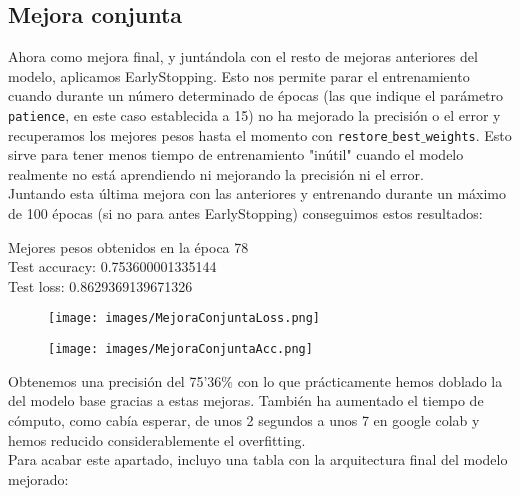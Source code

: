 \documentclass[12pt]{article}
\begin{document}
\subsection*{Mejora conjunta}
Ahora como mejora final, y juntándola con el resto de mejoras anteriores del modelo, aplicamos EarlyStopping. Esto nos permite parar el entrenamiento cuando durante un número determinado de épocas (las que indique el parámetro \texttt{patience}, en este caso establecida a 15) no ha mejorado la precisión o el error y recuperamos los mejores pesos hasta el momento con \texttt{restore$\_$best$\_$weights}. Esto sirve para tener menos tiempo de entrenamiento "inútil" cuando el modelo realmente no está aprendiendo ni mejorando la precisión ni el error.\\
Juntando esta última mejora con las anteriores y entrenando durante un máximo de 100 épocas (si no para antes EarlyStopping) conseguimos estos resultados:\\
\begin{center}
Mejores pesos obtenidos en la época 78\\
Test accuracy: 0.753600001335144\\
Test loss: 0.8629369139671326\\
\end{center}
\begin{figure}[H]
\centering
\parbox{8cm}{
\texttt{[image: images/MejoraConjuntaLoss.png]}
\caption{}
\label{fig:2figsA}}
\begin{minipage}{8cm}
\texttt{[image: images/MejoraConjuntaAcc.png]}
\caption{}
\label{fig:2figsB}
\end{minipage}
\end{figure}
Obtenemos una precisión del 75'36$\%$ con lo que prácticamente hemos doblado la del modelo base gracias a estas mejoras. También ha aumentado el tiempo de cómputo, como cabía esperar, de unos 2 segundos a unos 7 en google colab y hemos reducido considerablemente el overfitting.\\
Para acabar este apartado, incluyo una tabla con la arquitectura final del modelo mejorado:\\
\end{document}
